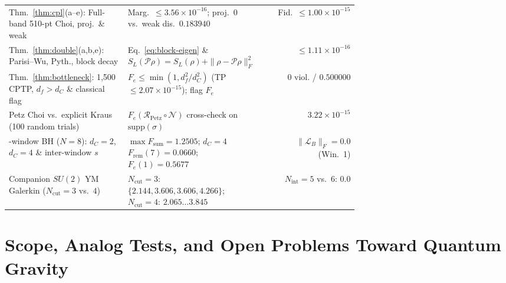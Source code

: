 \documentclass[11pt,a4paper]{article}
\theoremstyle{definition}
\theoremstyle{remark}
\newcommand{\cL}{\mathcal{L}}
\newcommand{\cR}{\mathcal{R}}
\newcommand{\cP}{\mathcal{P}}
\newcommand{\1}{\mathbf{1}}
\newcommand{\normF}[1]{\|#1\|_F}
\begin{document}
\begin{table}[!tbp]
\begin{tabular}{@{}>{\raggedright\arraybackslash}p{0.34\linewidth}>{\raggedright\arraybackslash}p{0.35\linewidth}r@{}}
Thm.~\ref{thm:cpl}(a--e): Full-band 510-pt Choi, proj.\ \& weak & Marg.\ $\le 3.56\times 10^{-16}$; proj.\ $0$ vs.\ weak dis.\ $0.183940$ & Fid.\ $\le 1.00\times 10^{-15}$ \\
Thm.~\ref{thm:double}(a,b,e): Parisi--Wu, Pyth., block decay & Eq.~\eqref{eq:block-eigen} \& $S_L(\cP\rho)=S_L(\rho)+\normF{\rho-\cP\rho}^2$ & $\le 1.11\times 10^{-16}$ \\
Thm.~\ref{thm:bottleneck}: 1,500 CPTP, $d_f>d_C$ \& classical flag & $F_e\le\min(1,d_f^2/d_C^2)$ (TP $\le 2.07\times 10^{-15}$); flag $F_e$ & 0 viol. / $0.500000$ \\
Petz Choi vs.\ explicit Kraus (100 random trials) & $F_e(\cR_{\mathrm{Petz}}\circ\mathcal{N})$ cross-check on $\mathrm{supp}(\sigma)$ & $3.22\times 10^{-15}$ \\
2-window BH ($N=8$): $d_C=2$, $d_C=4$ \& inter-window $s$ & $\max F_{\mathrm{sum}}=1.2505$; $d_C=4$ $F_{\mathrm{rem}}(7)=0.0660$; $F_e(1)=0.5677$ & $\normF{\cL_B}=0.0$ (Win.~1) \\
Companion $SU(2)$ YM Galerkin ($N_{\mathrm{cut}}=3$ vs.\ $4$) & $N_{\mathrm{cut}}=3$: $\{2.144,3.606,3.606,4.266\}$; $N_{\mathrm{cut}}=4$: $2.065\dots 3.845$ & $N_{\mathrm{int}}=5$ vs.\ $6$: $0.0$ \\
\bottomrule
\end{tabular}
\end{table}

\section{Scope, Analog Tests, and Open Problems Toward Quantum Gravity}\label{sec:discussion}
\end{document}
